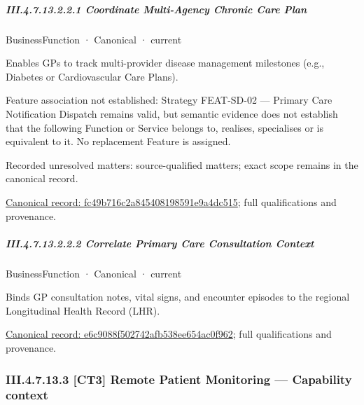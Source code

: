 \subparagraph*{III.4.7.13.2.2.1 Coordinate Multi-Agency Chronic Care Plan}
\label{navigation:III.4.7.13.2.2.1}

\label{element:fc49b716c2a845408198591e9a4dc515}
{\small BusinessFunction · Canonical · current}\par

Enables GPs to track multi-provider disease management milestones (e.g., Diabetes or Cardiovascular Care Plans).



Feature association not established: Strategy FEAT-SD-02 — Primary Care Notification Dispatch remains valid, but semantic evidence does not establish that the following Function or Service belongs to, realises, specialises or is equivalent to it. No replacement Feature is assigned.


{\small Recorded unresolved matters: source-qualified matters; exact scope remains in the canonical record.}\par
{\footnotesize \href{../../../../../../../continuum/business/business-function/fc49b716c2a845408198591e9a4dc515.md}{Canonical record: fc49b716c2a845408198591e9a4dc515}; full qualifications and provenance.}\par
\subparagraph*{III.4.7.13.2.2.2 Correlate Primary Care Consultation Context}
\label{navigation:III.4.7.13.2.2.2}

\label{element:e6c9088f502742afb538ee654ac0f962}
{\small BusinessFunction · Canonical · current}\par

Binds GP consultation notes, vital signs, and encounter episodes to the regional Longitudinal Health Record (LHR).


{\footnotesize \href{../../../../../../../continuum/business/business-function/e6c9088f502742afb538ee654ac0f962.md}{Canonical record: e6c9088f502742afb538ee654ac0f962}; full qualifications and provenance.}\par
\subsubsection*{III.4.7.13.3 [CT3] Remote Patient Monitoring — Capability context}
\label{navigation:III.4.7.13.3}

